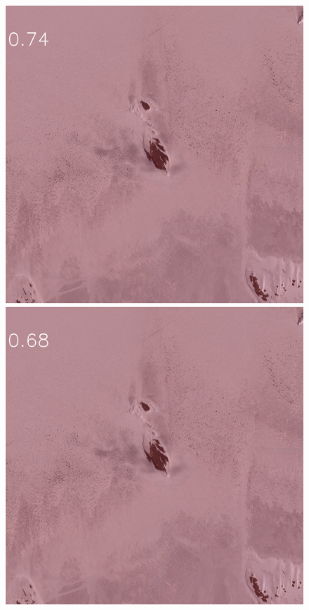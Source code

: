 \begin{figure}[h]
\includegraphics[width=\subFigx]{./fig/datagrow/MSE_single_unet_train_0_1.txt_bias-1_bs128_do0.1e25/WV02_20160101055824_103001004E1BFF00_16JAN01055824-M1BS-500637502050_01_P007_u08rf3031.png}
\includegraphics[width=\subFigx]{./fig/datagrow/MSE_single_unet_train_0_2.txt_bias-1_bs128_do0.1e25/WV02_20160101055824_103001004E1BFF00_16JAN01055824-M1BS-500637502050_01_P007_u08rf3031.png}

\end{figure}
